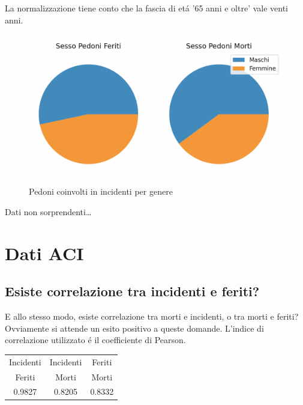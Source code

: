 \documentclass[a4paper]{report}
\begin{document}
La normalizzazione tiene conto che la fascia di et\'a '65 anni e oltre' vale venti anni.

\begin{figure}[!ht]
    \includegraphics[width=\linewidth]{../src/incidenti/incidenti_senza_coords/pedoni/sesso_morti_feriti.png}
    \caption{Pedoni coinvolti in incidenti per genere}
    \label{fig:sesso_morti_feriti}
\end{figure}

Dati non sorprendenti\dots





\clearpage
\section{Dati ACI}

\clearpage
\subsection{Esiste correlazione tra incidenti e feriti?}

E allo stesso modo, esiste correlazione tra morti e incidenti, o tra morti e feriti?\\
Ovviamente si attende un esito positivo a queste domande.
L'indice di correlazione utilizzato \'e il coefficiente di Pearson.
\begin{center}
    \begin{tabular}{ |c|c|c| } 
    \hline
    Incidenti & Incidenti & Feriti \\ 
    Feriti & Morti & Morti \\ 
    \hline
    0.9827 & 0.8205 & 0.8332 \\ 
    \hline
    \end{tabular}
\end{center}
\end{document}
